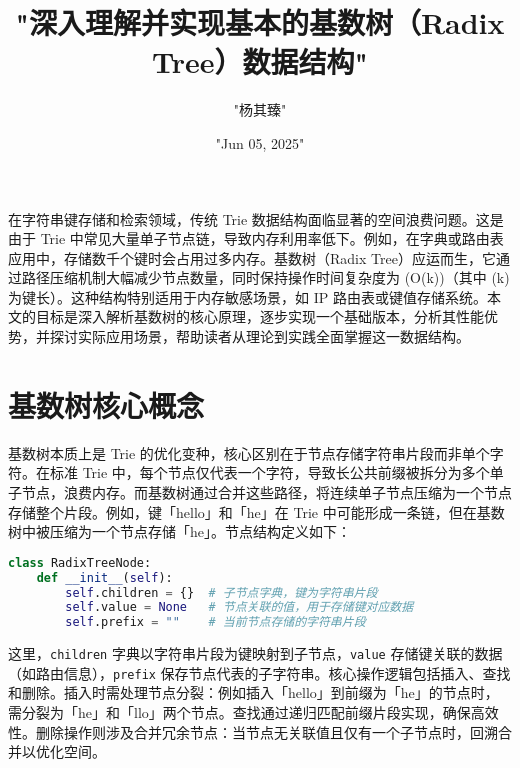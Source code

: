 \title{"深入理解并实现基本的基数树（Radix Tree）数据结构"}
\author{"杨其臻"}
\date{"Jun 05, 2025"}
\maketitle
在字符串键存储和检索领域，传统 Trie 数据结构面临显著的空间浪费问题。这是由于 Trie 中常见大量单子节点链，导致内存利用率低下。例如，在字典或路由表应用中，存储数千个键时会占用过多内存。基数树（Radix Tree）应运而生，它通过路径压缩机制大幅减少节点数量，同时保持操作时间复杂度为 (O(k))（其中 (k) 为键长）。这种结构特别适用于内存敏感场景，如 IP 路由表或键值存储系统。本文的目标是深入解析基数树的核心原理，逐步实现一个基础版本，分析其性能优势，并探讨实际应用场景，帮助读者从理论到实践全面掌握这一数据结构。\par
\chapter{基数树核心概念}
基数树本质上是 Trie 的优化变种，核心区别在于节点存储字符串片段而非单个字符。在标准 Trie 中，每个节点仅代表一个字符，导致长公共前缀被拆分为多个单子节点，浪费内存。而基数树通过合并这些路径，将连续单子节点压缩为一个节点存储整个片段。例如，键「hello」和「he」在 Trie 中可能形成一条链，但在基数树中被压缩为一个节点存储「he」。节点结构定义如下：\par
\begin{lstlisting}[language=python]
class RadixTreeNode:
    def __init__(self):
        self.children = {}  # 子节点字典，键为字符串片段
        self.value = None   # 节点关联的值，用于存储键对应数据
        self.prefix = ""    # 当前节点存储的字符串片段
\end{lstlisting}
这里，\verb!children! 字典以字符串片段为键映射到子节点，\verb!value! 存储键关联的数据（如路由信息），\verb!prefix! 保存节点代表的子字符串。核心操作逻辑包括插入、查找和删除。插入时需处理节点分裂：例如插入「hello」到前缀为「he」的节点时，需分裂为「he」和「llo」两个节点。查找通过递归匹配前缀片段实现，确保高效性。删除操作则涉及合并冗余节点：当节点无关联值且仅有一个子节点时，回溯合并以优化空间。\par
